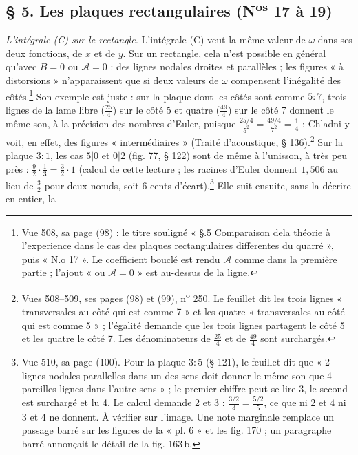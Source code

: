 \documentclass[11pt,a4paper]{article}
\begin{document}
\subsection*{§ 5. Les plaques rectangulaires (N\textsuperscript{os} 17 à 19)}

\emph{L'intégrale (C) sur le rectangle.} L'intégrale (C) veut la même valeur de
$\omega$ dans ses deux fonctions, de $x$ et de $y$. Sur un rectangle, cela
n'est possible en général qu'avec $B = 0$ ou $\mathcal{A} = 0$ : des lignes
nodales droites et parallèles ; les figures « à distorsions » n'apparaissent que
si deux valeurs de $\omega$ compensent l'inégalité des côtés.\footnote{Vue 508,
sa page (98) : le titre souligné « §.5 Comparaison dela théorie à l'experience
dans le cas des plaques rectangulaires differentes du quarré », puis
« N.o 17 ». Le coefficient bouclé est rendu $\mathcal{A}$ comme dans la
première partie ; l'ajout « ou $\mathcal{A}=0$ » est au-dessus de la ligne.}
Son exemple est juste : sur la plaque dont les côtés sont comme $5:7$, trois
lignes de la lame libre ($\frac{25}{4}$) sur le côté 5 et quatre
($\frac{49}{4}$) sur le côté 7 donnent le même son, à la précision des nombres
d'Euler, puisque
$\frac{25/4}{5^2} = \frac{49/4}{7^2} = \frac14$ ; Chladni y voit, en effet, des
figures « intermédiaires » (Traité d'acoustique, § 136).\footnote{Vues 508--509,
ses pages (98) et (99), n\textsuperscript{o} 250. Le feuillet dit les trois
lignes « transversales au côté qui est comme 7 » et les quatre « transversales
au côté qui est comme 5 » ; l'égalité demande que les trois lignes partagent le
côté 5 et les quatre le côté 7. Les dénominateurs de $\frac{25}{4}$ et de
$\frac{49}{4}$ sont surchargés.} Sur la plaque $3:1$, les cas $5|0$ et $0|2$
(fig. 77, § 122) sont de même à l'unisson, à très peu près :
$\frac{9}{2}\cdot\frac13 = \frac32\cdot 1$ (calcul de cette lecture ; les
racines d'Euler donnent $1{,}506$ au lieu de $\frac32$ pour deux nœuds, soit 6
cents d'écart).\footnote{Vue 510, sa page (100). Pour la plaque $3:5$ (§ 121),
le feuillet dit que « 2 lignes nodales parallelles dans un des sens doit donner le
même son que 4 pareilles lignes dans l'autre sens » ; le premier chiffre peut se
lire 3, le second est surchargé et lu 4. Le calcul demande 2 et 3 :
$\frac{3/2}{3} = \frac{5/2}{5}$, ce que ni $2$ et $4$ ni $3$ et $4$ ne
donnent. À vérifier sur l'image. Une note marginale remplace un passage barré
sur les figures de la « pl. 6 » et les fig. 170 ; un paragraphe barré annonçait
le détail de la fig. 163\,b.} Elle suit ensuite, sans la décrire en entier, la
\end{document}
